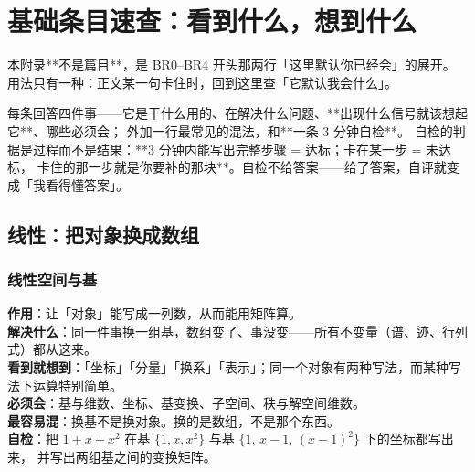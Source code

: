 
\appendix
\section{基础条目速查：看到什么，想到什么}
\label{sec:appendix}

\noindent\small
本附录**不是篇目**，是 BR0--BR4 开头那两行「这里默认你已经会」的展开。
用法只有一种：正文某一句卡住时，回到这里查「它默认我会什么」。

每条回答四件事——它是干什么用的、在解决什么问题、**出现什么信号就该想起它**、哪些必须会；
外加一行最常见的混法，和**一条 3 分钟自检**。
自检的判据是过程而不是结果：**3 分钟内能写出完整步骤 = 达标；卡在某一步 = 未达标，
卡住的那一步就是你要补的那块**。自检不给答案——给了答案，自评就变成「我看得懂答案」。\normalsize

\subsection{线性：把对象换成数组}
\label{app:lin}

\subsubsection*{线性空间与基}
\textbf{作用}：让「对象」能写成一列数，从而能用矩阵算。\\
\textbf{解决什么}：同一件事换一组基，数组变了、事没变——所有不变量（谱、迹、行列式）都从这来。\\
\textbf{看到就想到}：「坐标」「分量」「换系」「表示」；同一个对象有两种写法，而某种写法下运算特别简单。\\
\textbf{必须会}：基与维数、坐标、基变换、子空间、秩与解空间维数。\\
\textbf{最容易混}：换基不是换对象。换的是数组，不是那个东西。\\
\textbf{自检}：把 $1+x+x^{2}$ 在基 $\{1,x,x^{2}\}$ 与基 $\{1,\,x-1,\,(x-1)^{2}\}$ 下的坐标都写出来，
并写出两组基之间的变换矩阵。

